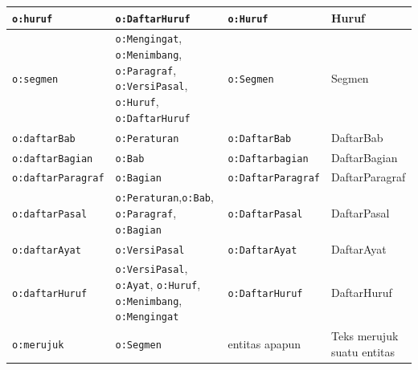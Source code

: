 \begin{longtable}{|p{}|p{}|p{}|p{}|}
  \texttt{o:huruf}           & \texttt{o:DaftarHuruf}                                                                                                           & \texttt{o:Huruf}                                      & Huruf                                             \\ \hline
  \texttt{o:segmen}          & \texttt{o:Mengingat}, \texttt{o:Menimbang}, \texttt{o:Paragraf}, \texttt{o:VersiPasal}, \texttt{o:Huruf}, \texttt{o:DaftarHuruf} & \texttt{o:Segmen}                                     & Segmen                                            \\ \hline
  \texttt{o:daftarBab}       & \texttt{o:Peraturan}                                                                                                             & \texttt{o:DaftarBab}                                  & DaftarBab                                         \\ \hline
  \texttt{o:daftarBagian}    & \texttt{o:Bab}                                                                                                                   & \texttt{o:Daftarbagian}                               & DaftarBagian                                      \\ \hline
  \texttt{o:daftarParagraf}  & \texttt{o:Bagian}                                                                                                                & \texttt{o:DaftarParagraf}                             & DaftarParagraf                                    \\ \hline
  \texttt{o:daftarPasal}     & \texttt{o:Peraturan},\texttt{o:Bab}, \texttt{o:Paragraf}, \texttt{o:Bagian}                                                      & \texttt{o:DaftarPasal}                                & DaftarPasal                                       \\ \hline
  \texttt{o:daftarAyat}      & \texttt{o:VersiPasal}                                                                                                            & \texttt{o:DaftarAyat}                                 & DaftarAyat                                        \\ \hline
  \texttt{o:daftarHuruf}     & \texttt{o:VersiPasal}, \texttt{o:Ayat}, \texttt{o:Huruf}, \texttt{o:Menimbang}, \texttt{o:Mengingat}                             & \texttt{o:DaftarHuruf}                                & DaftarHuruf                                       \\ \hline
  \texttt{o:merujuk}         & \texttt{o:Segmen}                                                                                                                & entitas apapun                                        & Teks merujuk suatu entitas                        \\ \hline

\end{longtable}
